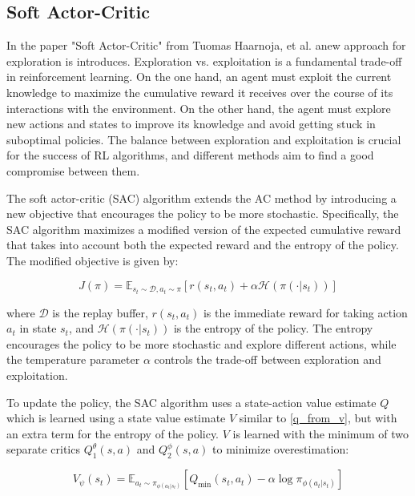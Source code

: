 \subsection{Soft Actor-Critic}
\label{SAC}
In the paper "Soft Actor-Critic" from Tuomas Haarnoja, et al. \cite{haarnoja2018soft} anew approach for exploration is introduces. Exploration vs. exploitation 
is a fundamental trade-off in reinforcement learning. On the one hand, an agent must exploit the current knowledge to maximize the cumulative reward it receives 
over the course of its interactions with the environment. On the other hand, the agent must explore new actions and states to improve its knowledge and avoid getting stuck in suboptimal policies. 
The balance between exploration and exploitation is crucial for the success of RL algorithms, and different methods aim to find a good compromise between them.

The soft actor-critic (SAC) algorithm extends the AC method by introducing a new objective that encourages the policy to be more stochastic. Specifically, the SAC algorithm maximizes a modified 
version of the expected cumulative reward that takes into account both the expected reward and the entropy of the policy. The modified objective is given by:

\begin{equation}
J(\pi) = \mathbb{E}_{s_t \sim \mathcal{D}, a_t \sim \pi}[r(s_t, a_t) + \alpha \mathcal{H}(\pi(\cdot|s_t))]
\end{equation}

where $\mathcal{D}$ is the replay buffer, $r(s_t, a_t)$ is the immediate reward for taking action $a_t$ in state $s_t$, and $\mathcal{H}(\pi(\cdot|s_t))$ is the entropy of the policy. The entropy 
encourages the policy to be more stochastic and explore different actions, while the temperature parameter $\alpha$ controls the trade-off between exploration and exploitation.

To update the policy, the SAC algorithm uses a state-action value estimate $Q$ which is learned using a state value estimate $V$ similar to \ref{q_from_v}, 
but with an extra term for the entropy of the policy. $V$ is learned with the minimum of two separate critics $Q_1^\theta(s,a)$ and $Q_2^\phi(s,a)$ 
to minimize overestimation:

\begin{equation}
    V_{\psi}(s_t) = \mathbb{E}_{a_t \sim \pi_{\phi(a_t|s_t)}}[Q_\text{min}(s_t, a_t) - \alpha \log \pi_{\phi(a_t|s_t)}]
\end{equation}

